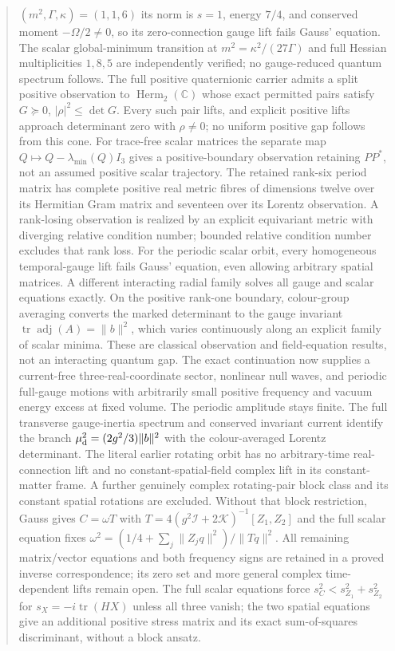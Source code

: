 \documentclass[11pt,letterpaper]{article}
\theoremstyle{definition}
\theoremstyle{remark}
\begin{document}
\begin{abstract}
$(m^2,\Gamma,\kappa)=(1,1,6)$ its norm is $s=1$, energy $7/4$, and
conserved moment $-\Omega/2\ne0$, so its zero-connection gauge lift fails
Gauss' equation. The scalar global-minimum transition at
$m^2=\kappa^2/(27\Gamma)$ and full Hessian multiplicities $1,8,5$ are
independently verified; no gauge-reduced quantum spectrum follows.
The full positive quaternionic carrier admits a split positive observation
to $\operatorname{Herm}_2(\mathbb C)$ whose exact permitted pairs satisfy
$G\succeq0$, $|\rho|^2\leq\det G$. Every such pair lifts, and explicit
positive lifts approach determinant zero with $\rho\ne0$; no uniform
positive gap follows from this cone. For trace-free scalar matrices the
separate map $Q\mapsto Q-\lambda_{\min}(Q)I_3$ gives a positive-boundary
observation retaining $PP^*$, not an assumed positive scalar trajectory.
The retained rank-six period matrix has complete positive real metric
fibres of dimensions twelve over its Hermitian Gram matrix and seventeen
over its Lorentz observation. A rank-losing observation is realized by
an explicit equivariant metric with diverging relative condition number;
bounded relative condition number excludes that rank loss.
For the periodic scalar orbit, every homogeneous temporal-gauge lift
fails Gauss' equation, even allowing arbitrary spatial matrices.
A different interacting radial family solves all gauge and scalar
equations exactly. On the positive rank-one boundary, colour-group
averaging converts the marked determinant to the gauge invariant
$\operatorname{tr}\operatorname{adj}(A)=\|b\|^2$, which varies continuously
along an explicit family of scalar minima. These are classical
observation and field-equation results, not an interacting quantum gap.
The exact continuation now supplies a current-free three-real-coordinate
sector, nonlinear null waves, and periodic full-gauge motions with
arbitrarily small positive frequency and vacuum energy excess at fixed
volume. The periodic amplitude stays finite. The full transverse
gauge-inertia spectrum and conserved invariant current identify the branch
$\mu_{\rm d}^2=(2g^2/3)\|b\|^2$ with the colour-averaged Lorentz determinant.
The literal earlier rotating orbit has no arbitrary-time real-connection
lift and no constant-spatial-field complex lift in its constant-matter
frame. A further genuinely complex rotating-pair block class and its
constant spatial rotations are excluded. Without that block restriction,
Gauss gives $C=\omega T$ with
$T=4(g^2\mathcal I+2\mathcal K)^{-1}[Z_1,Z_2]$ and the full scalar
equation fixes $\omega^2=(1/4+\sum_j\|Z_jq\|^2)/\|Tq\|^2$.
All remaining matrix/vector equations and both frequency signs are
retained in a proved inverse correspondence; its zero set and more
general complex time-dependent lifts remain open.
The full scalar equations force $s_C^2<s_{Z_1}^2+s_{Z_2}^2$ for
$s_X=-i\operatorname{tr}(HX)$ unless all three vanish; the two spatial
equations give an additional positive stress matrix and its exact
sum-of-squares discriminant, without a block ansatz.


\end{abstract}
\end{document}
